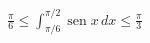 \item $\displaystyle \frac{\pi}{6} \le \int_{\pi/6}^{\pi/2} \operatorname{sen} x \, dx \le \frac{\pi}{3}$
